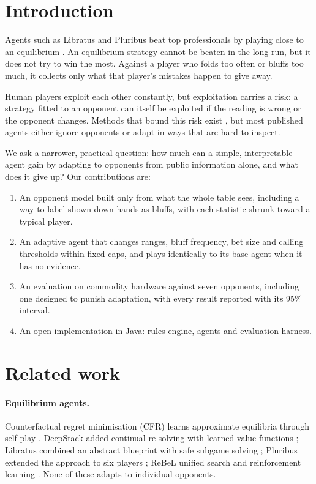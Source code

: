 
\section{Introduction}

Agents such as Libratus and Pluribus beat top professionals by playing close to an
equilibrium \citep{brown2018,brown2019}. An equilibrium strategy cannot be beaten in the long
run, but it does not try to win the most. Against a player who folds too often or bluffs too
much, it collects only what that player's mistakes happen to give away.

Human players exploit each other constantly, but exploitation carries a risk: a strategy
fitted to an opponent can itself be exploited if the reading is wrong or the opponent
changes. Methods that bound this risk exist \citep{johanson2008,ganzfried2011,ganzfried2015},
but most published agents either ignore opponents or adapt in ways that are hard to inspect.

We ask a narrower, practical question: how much can a simple, interpretable agent gain by
adapting to opponents from public information alone, and what does it give up? Our
contributions are:
\begin{enumerate}
\item An opponent model built only from what the whole table sees, including a way to label
shown-down hands as bluffs, with each statistic shrunk toward a typical player.
\item An adaptive agent that changes ranges, bluff frequency, bet size and calling thresholds
within fixed caps, and plays identically to its base agent when it has no evidence.
\item An evaluation on commodity hardware against seven opponents, including one designed to
punish adaptation, with every result reported with its 95\% interval.
\item An open implementation in Java: rules engine, agents and evaluation harness.
\end{enumerate}

\section{Related work}

\paragraph{Equilibrium agents.} Counterfactual regret minimisation (CFR) learns approximate
equilibria through self-play \citep{zinkevich2008}. DeepStack added continual re-solving
with learned value functions \citep{moravcik2017}; Libratus combined an abstract blueprint
with safe subgame solving \citep{brown2018}; Pluribus extended the approach to six players
\citep{brown2019}; ReBeL unified search and reinforcement learning \citep{brown2020}. None of
these adapts to individual opponents.

